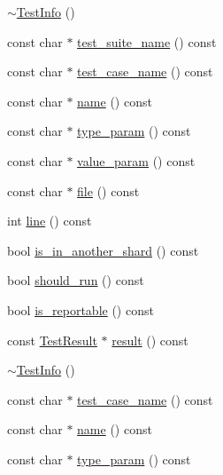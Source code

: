 \begin{DoxyCompactItemize}
\item 
\mbox{\hyperlink{classtesting_1_1_test_info_a8d382c1b1b511f0d9112c14684809852}{$\sim$\+Test\+Info}} ()
\item 
const char $\ast$ \mbox{\hyperlink{classtesting_1_1_test_info_a82a84ffd0e4d18eb5a3f97a2077e12cc}{test\+\_\+suite\+\_\+name}} () const
\item 
const char $\ast$ \mbox{\hyperlink{classtesting_1_1_test_info_a036a20710c8c2252889544daba9a8ff9}{test\+\_\+case\+\_\+name}} () const
\item 
const char $\ast$ \mbox{\hyperlink{classtesting_1_1_test_info_ac2581b45eccc9a3b94cb41c4807d0e34}{name}} () const
\item 
const char $\ast$ \mbox{\hyperlink{classtesting_1_1_test_info_a7759bc57f4350ad406cbbb0b3bcea320}{type\+\_\+param}} () const
\item 
const char $\ast$ \mbox{\hyperlink{classtesting_1_1_test_info_abdf2c6cfcf4819e725816c64e1c1fc24}{value\+\_\+param}} () const
\item 
const char $\ast$ \mbox{\hyperlink{classtesting_1_1_test_info_a9b74d79cf618ce5bb0d0b1da75ee8b35}{file}} () const
\item 
int \mbox{\hyperlink{classtesting_1_1_test_info_af5931cfc594b5d660c56b3c61c41ea13}{line}} () const
\item 
bool \mbox{\hyperlink{classtesting_1_1_test_info_a8621f2cf7623fd1609db8e324f0c2fec}{is\+\_\+in\+\_\+another\+\_\+shard}} () const
\item 
bool \mbox{\hyperlink{classtesting_1_1_test_info_a866e33b5bc5ab2a6e5375fc7d3af0f96}{should\+\_\+run}} () const
\item 
bool \mbox{\hyperlink{classtesting_1_1_test_info_a63e7042028b0b846f4b5a1e5bcffc079}{is\+\_\+reportable}} () const
\item 
const \mbox{\hyperlink{classtesting_1_1_test_result}{Test\+Result}} $\ast$ \mbox{\hyperlink{classtesting_1_1_test_info_aee8cb884c95cd446129aba936b4159e0}{result}} () const
\item 
\mbox{\hyperlink{classtesting_1_1_test_info_a8d382c1b1b511f0d9112c14684809852}{$\sim$\+Test\+Info}} ()
\item 
const char $\ast$ \mbox{\hyperlink{classtesting_1_1_test_info_a036a20710c8c2252889544daba9a8ff9}{test\+\_\+case\+\_\+name}} () const
\item 
const char $\ast$ \mbox{\hyperlink{classtesting_1_1_test_info_ac2581b45eccc9a3b94cb41c4807d0e34}{name}} () const
\item 
const char $\ast$ \mbox{\hyperlink{classtesting_1_1_test_info_a7759bc57f4350ad406cbbb0b3bcea320}{type\+\_\+param}} () const

\end{DoxyCompactItemize}
